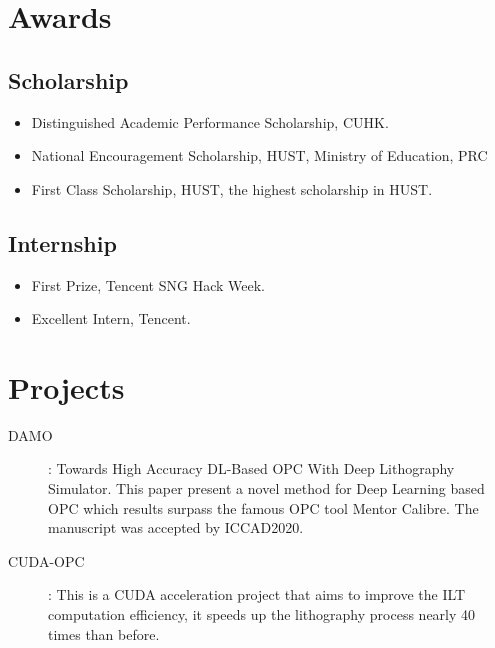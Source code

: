 \documentclass{mycv}
\begin{document}

\section{Awards}
\subsection{Scholarship}
\vspace{-\parskip}%
\begin{itemize}
  \item Distinguished Academic Performance Scholarship, CUHK. 
  \item National Encouragement Scholarship, HUST, Ministry of Education, PRC 
  \item First Class Scholarship, HUST, the highest scholarship in HUST. 
\end{itemize}
\vspace{-\parskip}%
\subsection{Internship}
\vspace{-\parskip}%
\begin{itemize}
  \item First Prize, Tencent SNG Hack Week. 
  \item Excellent Intern, Tencent. 
\end{itemize}


\section{Projects}

\begin{description}
  \item[DAMO]: Towards High Accuracy DL-Based OPC With Deep Lithography Simulator. This paper present a novel method for Deep Learning based OPC which results surpass the famous OPC tool Mentor Calibre. The manuscript was accepted by ICCAD2020.
  \item[CUDA-OPC]: This is a CUDA acceleration project that aims to improve the ILT computation efficiency, it speeds up the lithography process nearly 40 times than before.
\end{description}
\end{document}
